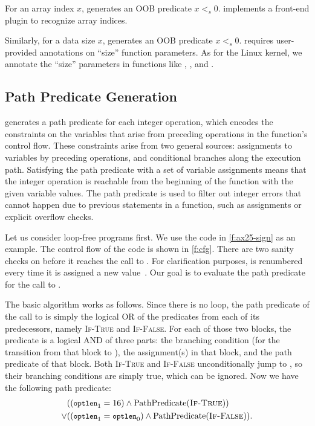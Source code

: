 For an array index $x$, \sys generates an OOB predicate $x <_s 0$.
\sys implements a front-end plugin to recognize array indices.

Similarly, for a data size $x$, \sys generates an OOB predicate $x <_s 0$.
\sys requires user-provided annotations on ``size'' function parameters.  
As for the Linux kernel, we annotate the ``size'' parameters in functions 
like , , and .

\subsection{Path Predicate Generation}
\label{s:gen:path}

\sys generates a path predicate for each integer operation, which encodes
the constraints on the variables that arise from preceding operations
in the function's control flow.  These constraints arise from two general
sources: assignments to variables by preceding operations, and conditional
branches along the execution path.  Satisfying the path predicate with
a set of variable assignments means that the integer operation is
reachable from the beginning of the function with the given variable values.
The path predicate is used to filter out integer errors that cannot
happen due to previous statements in a function, such as assignments or
explicit overflow checks.

Let us consider loop-free programs first.
%
We use the code in \autoref{f:ax25-sign} as an example.  The control flow of
the code is shown in \autoref{f:cfg}.  There are two sanity checks
on  before it reaches the call to .
For clarification purposes,  is renumbered every time it is
assigned a new value~\cite[\subsectionautorefname~8.11]{whale}.  Our
goal is to evaluate the path predicate for the call to .

The basic algorithm works as follows.  Since there is no loop, the
path predicate of the call to  is simply the
logical OR of the predicates from each of its predecessors, namely
\textsc{If-True} and \textsc{If-False}.  For each of those two blocks,
the predicate is a logical AND of three parts: the branching condition
(for the transition from that block to ), the
assignment(s) in that block, and the path predicate
of that block.  Both \textsc{If-True} and \textsc{If-False}
unconditionally jump to , so their branching
conditions are simply true, which can be ignored.  Now we have the
following path predicate:
\newcommand{\optlen}{{\small \texttt{optlen}}}
\newcommand{\pc}{\textrm{PathPredicate}}
%
\begin{align*}
& ((\optlen_1 = 16) \land \pc(\textsc{If-True})) \\
\lor & ((\optlen_1 = \optlen_0) \land \pc(\textsc{If-False})).
\end{align*}

